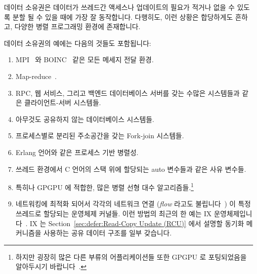 데이터 소유권은 데이터가 쓰레드간 액세스나 업데이트의 필요가 적거나 없을 수
있도록 분할 될 수 있을 때에 가장 잘 동작합니다.
다행히도, 이런 상황은 합당하게도 흔하고, 다양한 병렬 프로그래밍 환경에
존재합니다.

데이터 소유권의 예에는 다음의 것들도 포함됩니다:
\iffalse

Data ownership works best when the data can be partitioned so that there
is little or no need for cross thread access or update.
Fortunately, this situation is reasonably common, and in a wide variety
of parallel-programming environments.

Examples of data ownership include:
\fi

\begin{enumerate}
\item	MPI~\cite{MPIForum2008} 와 BOINC~\cite{BOINC2008} 같은 모든 메세지 전달
	환경.
\item	Map-reduce~\cite{MapReduce2008MIT}.
\item	RPC, 웹 서비스, 그리고 백엔드 데이터베이스 서버를 갖는 수많은
	시스템들과 같은 클라이언트-서버 시스템들.
\item	아무것도 공유하지 않는 데이터베이스 시스템들.
\item	프로세스별로 분리된 주소공간을 갖는 Fork-join 시스템들.
\item	Erlang 언어와 같은 프로세스 기반 병렬성.
\item	쓰레드 환경에서 C 언어의 스택 위에 할당되는 auto 변수들과 같은 사유
	변수들.
\item	특히나 GPGPU 에 적합한, 많은 병렬 선형 대수 알고리즘들.\footnote{
		하지만 굉장히 많은 다른 부류의 어플리케이션들 또한 GPGPU 로
		포팅되었음을 알아두시기
		바랍니다~\cite{NormMatloff2013ParProcBook,AMD2017OpenCL,NVidia2017GPGPU,NVidia2017GPGPU-university}.}
\item	네트워킹에 최적화 되어서 각각의 네트워크 연결 (\emph{flow} 라고도
	불립니다~\cite{Shenker89,ZhangPhD,McKenney90}) 이 특정 쓰레드로
	할당되는 운영체제 커널들.
	이런 방법의 최근의 한 예는 IX
	운영체제입니다~\cite{Belay:2016:IOS:3014162.2997641}.
	IX 는 Section~\ref{sec:defer:Read-Copy Update (RCU)} 에서 설명할 동기화
	메커니즘을 사용하는 공유 데이터 구조를 일부 갖습니다.
\iffalse


\end{enumerate}

